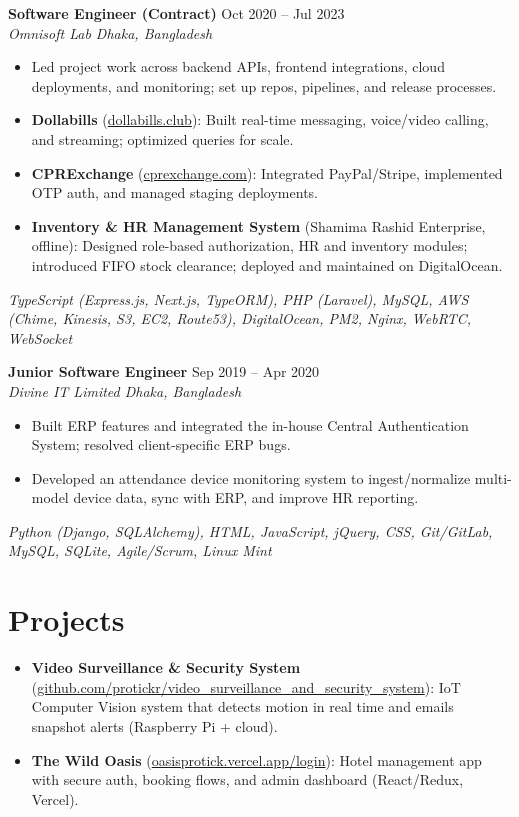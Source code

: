 \documentclass[a4paper,10pt]{article}
\begin{document}
\vspace{1pt}

\textbf{Software Engineer (Contract)} \hfill Oct 2020 -- Jul 2023\\[-2pt]
\textit{Omnisoft Lab \textbar{} Dhaka, Bangladesh}\\[-4pt]
\begin{itemize}
  \item Led project work across backend APIs, frontend integrations, cloud deployments, and monitoring; set up repos, pipelines, and release processes.
  \item \textbf{Dollabills} (\href{https://dollabills.club}{dollabills.club}): Built real-time messaging, voice/video calling, and streaming; optimized queries for scale.
  \item \textbf{CPRExchange} (\href{https://cprexchange.com}{cprexchange.com}): Integrated PayPal/Stripe, implemented OTP auth, and managed staging deployments.
\item \textbf{Inventory \& HR Management System} (Shamima Rashid Enterprise, offline): Designed role-based authorization, HR and inventory modules; introduced FIFO stock clearance; deployed and maintained on DigitalOcean.
\end{itemize}
\emph{TypeScript (Express.js, Next.js, TypeORM), PHP (Laravel), MySQL, AWS (Chime, Kinesis, S3, EC2, Route53), DigitalOcean, PM2, Nginx, WebRTC, WebSocket}

\vspace{1pt}

\textbf{Junior Software Engineer} \hfill Sep 2019 -- Apr 2020\\[-2pt]
\textit{Divine IT Limited \textbar{} Dhaka, Bangladesh}\\[-4pt]
\begin{itemize}
  \item Built ERP features and integrated the in-house Central Authentication System; resolved client-specific ERP bugs.
  \item Developed an attendance device monitoring system to ingest/normalize multi-model device data, sync with ERP, and improve HR reporting.
\end{itemize}
\emph{Python (Django, SQLAlchemy), HTML, JavaScript, jQuery, CSS, Git/GitLab, MySQL, SQLite, Agile/Scrum, Linux Mint}

\section*{Projects}
\begin{itemize}
  \item \textbf{Video Surveillance \& Security System} (\href{https://github.com/protickr/video_surveillance_and_security_system}{github.com/protickr/video\_surveillance\_and\_security\_system}): IoT Computer Vision system that detects motion in real time and emails snapshot alerts (Raspberry Pi + cloud).
  \item \textbf{The Wild Oasis} (\href{https://oasisprotick.vercel.app/login}{oasisprotick.vercel.app/login}): Hotel management app with secure auth, booking flows, and admin dashboard (React/Redux, Vercel).
\end{itemize}
\end{document}
